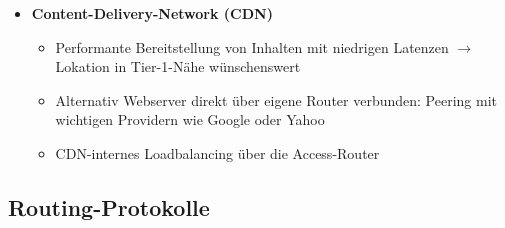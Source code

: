 \begin{itemize}
	\item \textbf{Content-Delivery-Network (CDN)}
	\begin{itemize}
		\item Performante Bereitstellung von Inhalten mit niedrigen Latenzen \(\rightarrow\) Lokation in Tier-1-Nähe wünschenswert
		\item Alternativ Webserver direkt über eigene Router verbunden: Peering mit wichtigen Providern wie Google oder Yahoo
		\item CDN-internes Loadbalancing über die Access-Router
	\end{itemize}
\end{itemize}


\subsection{Routing-Protokolle}

